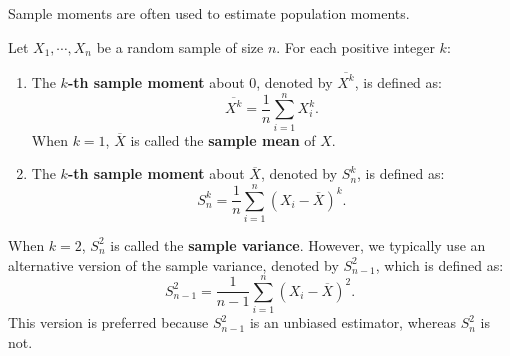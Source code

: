 \documentclass{huhtakm-template-book-v2}
\begin{document}
    Sample moments are often used to estimate population moments.
    \begin{defn}
        Let $X_{1}, \cdots, X_{n}$ be a random sample of size $n$. For each positive integer $k$:
        \begin{enumerate}
            \item The \textbf{$k$-th sample moment} about $0$, denoted by $\overline{X^{k}}$, is defined as:
            \begin{equation*}
                \overline{X^{k}} = \frac{1}{n} \sum_{i=1}^{n} X_{i}^{k}.
            \end{equation*}
            When $k = 1$, $\overline{X}$ is called the \textbf{sample mean} of $X$.
            \item The \textbf{$k$-th sample moment} about $\overline{X}$, denoted by $S_{n}^{k}$, is defined as:
            \begin{equation*}
                S_{n}^{k} = \frac{1}{n} \sum_{i=1}^{n} (X_{i} - \overline{X})^{k}.
            \end{equation*}
        \end{enumerate}
    \end{defn}
    \begin{eg}
        When $k = 2$, $S_{n}^{2}$ is called the \textbf{sample variance}. However, we typically use an alternative version of the sample variance, denoted by $S_{n-1}^{2}$, which is defined as:
        \begin{equation*}
            S_{n-1}^{2} = \frac{1}{n - 1} \sum_{i=1}^{n} (X_{i} - \overline{X})^{2}.
        \end{equation*}
        This version is preferred because $S_{n-1}^{2}$ is an unbiased estimator, whereas $S_{n}^{2}$ is not.
    \end{eg}
    \newpage
\end{document}
